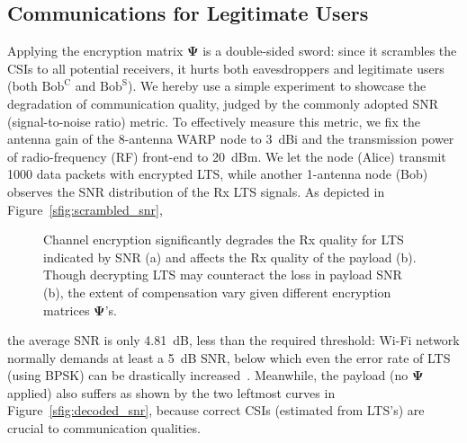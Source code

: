 \documentclass[conference,compsoc]{IEEEtran}
\begin{document}
\subsection{Communications for Legitimate Users} \label{ssec:plu}
\vspace{-1.5ex}
%
Applying the encryption matrix $\bm{\Psi}$ is a double-sided sword: since it scrambles the CSIs to all potential receivers, it hurts both eavesdroppers and legitimate users (both $\mathrm{Bob^C}$ and $\mathrm{Bob^S}$). We hereby use a simple experiment to showcase the degradation of communication quality, judged by the commonly adopted SNR (signal-to-noise ratio) metric.
%
To effectively measure this metric, we fix the antenna gain of the 8-antenna WARP node to 3~\!dBi and the transmission power of radio-frequency (RF) front-end to 20~\!dBm. We let the node (Alice) transmit 1000 data packets with encrypted LTS, while another 1-antenna node (Bob) observes the SNR distribution of the Rx LTS signals. As depicted in Figure~\ref{sfig:scrambled_snr}, 
%
\begin{figure}[t]
	\setlength\abovecaptionskip{8pt}
	\vspace{-1ex}
	\centering
	\hfill
	\caption{Channel encryption significantly degrades the Rx quality for LTS indicated by SNR (a) and affects the Rx quality of the payload (b). Though decrypting LTS may counteract the loss in payload SNR (b), the extent of compensation vary given different encryption matrices $\bm{\Psi}$'s.}
	\label{fig:scrambled_decoded_snr}
	\vspace{-1.5ex}
\end{figure}
%
the average SNR is only 4.81~\!dB, less than the required threshold: Wi-Fi network normally demands at least a 5~\!dB SNR, below which even the error rate of LTS (using BPSK) can be drastically increased~\cite{SNR-MobiCom16}. Meanwhile, the payload (no $\bm{\Psi}$ applied) also suffers as shown by the two leftmost curves in Figure~\ref{sfig:decoded_snr}, because correct CSIs (estimated from LTS's) are crucial to communication qualities.
\end{document}
